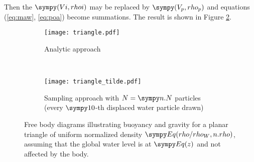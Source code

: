 Then the $\s{(Vi, rhoi)}$ may be replaced by $\s{(V_p, rho_p)}$ and equations (\ref{eq:maw}, \ref{eq:poa}) become summations.
The result is shown in Figure \ref{fg:fbdb}.  
\begin{figure}
\centering
\begin{subfigure}[t]{0.4\textwidth}
\texttt{[image: triangle.pdf]}
\caption{Analytic approach}
\label{fg:fbda}
\end{subfigure}
~
\begin{subfigure}[t]{0.4\textwidth}
\texttt{[image: triangle\_tilde.pdf]}
\caption{Sampling approach with $N = \s{n.N}$ particles (every $\s{10}$-th displaced water particle drawn)}
\label{fg:fbdb}
\end{subfigure}
\caption{Free body diagrams illustrating buoyancy and gravity for a planar triangle of uniform normalized density $\s{Eq(rho/rho_W, n.rho)}$, assuming that the global water level is at $\s{Eq(z)}$ and not affected by the body.}
\label{fg:fbd}
\end{figure}

